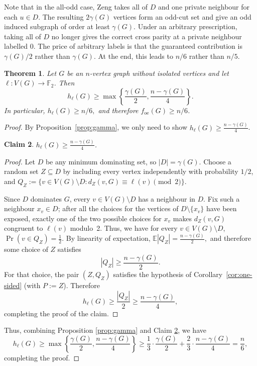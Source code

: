 \documentclass[10pt,a4paper]{amsart}
\newcommand{\VV}[1]{{#1}}
\newtheorem{theorem}{Theorem}
\newtheorem{claim}[theorem]{Claim}
\newcommand{\foe}{f_{\mathrm{oe}}}
\newcommand{\F}{\mathbb{F}}
\newcommand{\1}{\mathbf{1}}
\begin{document}
		Note that in the all-odd case, Zeng takes all of $D$ and one private neighbour for each $u\in D$. The resulting $2\gamma(G)$ vertices form an odd-cut set and give an odd induced subgraph of order at least $\gamma(G)$.  Under an arbitrary prescription, taking all of $D$ no longer gives the correct cross parity at a private neighbour labelled $0$. The price of arbitrary labels is that the guaranteed contribution is $\gamma(G)/2$ rather than $\gamma(G)$. At the end, this leads to $n/6$ rather than $n/5.$


	\begin{theorem}\label{thm:pointwise}
		Let $G$ be an $n$-vertex graph without isolated vertices and let
		$\ell:V(G)\to\F_2$.  Then
		\[
		h_\ell(G)\ge
		\max\left\{
		\frac{\gamma(G)}2,
		\frac{n-\gamma(G)}4
		\right\}.
		\]
		In particular,
		\VV{$
		h_\ell(G)\ge n/6,
		$ and therefore $\foe(G)\ge n/6$.}
	\end{theorem}

	\begin{proof}
     By \VV{Proposition}~\ref{prop:gamma}, we only need to show $
	h_\ell(G)\ge \frac{n-\gamma(G)}{4}$. 
		
		\begin{claim}\label{cl:n-gamma/4}
			$h_\ell(G)\ge \frac{n-\gamma(G)}{4}$. 
		\end{claim}
		
		\begin{proof}
					Let $D$ be any minimum dominating set, so $|D|=\gamma(G)$.  Choose a random
			set $Z\subseteq D$ by including every vertex independently with probability
			$1/2$, and $Q_Z:=\bigl\{v\in V(G)\setminus D: d_Z(v,G)\equiv\ell(v)\pmod2\bigr\}.$
			
			Since $D$ dominates $G$, every $v\in V(G)\setminus D$ has a neighbour in $D$. \VV{Fix such a neighbour $x_v\in D$; after all the choices for the vertices of $D\setminus\{x_v\}$ have been exposed, exactly one of the two possible choices for $x_v$ makes $d_Z(v,G)$ congruent to $\ell(v)$ modulo~2.} Thus, we have for every $v\in V(G)\setminus D$, $\Pr(v\in Q_Z)=\frac12$.
			By linearity of expectation,
			$
			\mathbb E|Q_Z|=\frac{n-\gamma(G)}2,
			$
			and therefore some choice of $Z$ satisfies
			\[
			|Q_Z|\ge \frac{n-\gamma(G)}2.
			\]
			For that choice, the pair $(Z,Q_Z)$ satisfies the hypothesis of
			Corollary~\ref{cor:one-sided} (with $P:=Z$).  Therefore
			\[
			h_\ell(G)
			\ge \frac{|Q_Z|}{2}
			\ge \frac{n-\gamma(G)}4,
			\]
		completing the proof of the claim.
		\end{proof}
		
		Thus, combining Proposition \ref{prop:gamma} and Claim \ref{cl:n-gamma/4}, we have
		\[
		h_\ell(G)\ge
		\max\left\{
		\frac{\gamma(G)}2,
		\frac{n-\gamma(G)}4
		\right\}\geq \frac{1}{3}\cdot \frac{\gamma(G)}{2}+\frac{2}{3}\cdot\frac{n-\gamma(G)}{4}=\frac{n}{6},
		\]
		completing the proof.
	\end{proof}
	
\end{document}
